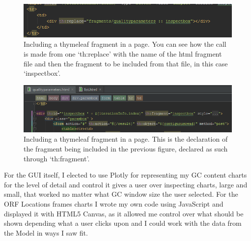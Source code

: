 \begin{figure}[H]
	\centering
\includegraphics[width=1\textwidth]{images/thymeleafinsert1}
\caption{Including a thymeleaf fragment in a page. You can see how the call is made from one `th:replace' with the name of the html fragment file and then the fragment to be included from that file, in this case `inspectbox'.}
\end{figure}
\begin{figure}[H]
\centering
\includegraphics[width=1\textwidth]{images/thymeleafinsert2}
\caption{Including a thymeleaf fragment in a page. This is the declaration of the fragment being included in the previous figure, declared as such through `th:fragment'.}
\end{figure}

For the GUI itself, I elected to use Plotly for representing my GC content charts for the level of detail and control it gives a user over inspecting charts, large and small, that worked no matter what GC window size the user selected. For the ORF Locations frames charts I wrote my own code using JavaScript and displayed it with HTML5 Canvas, as it allowed me control over what should be shown depending what a user clicks upon and I could work with the data from the Model in ways I saw fit.


